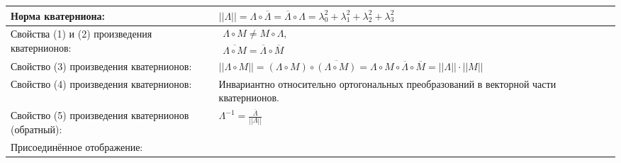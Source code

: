 \documentclass{article}
\begin{document}
\begin{tabular}{ |p{3.8cm}|p{5.7cm}|p{3.8cm}|p{5.7cm}|  }
Норма кватерниона:                                                           &  %
$||\Lambda|| = \Lambda \circ \overline{\Lambda} =
 \overline{\Lambda} \circ \Lambda =
 \lambda_{0}^2 + \lambda_{1}^2 + \lambda_{2}^2 + \lambda_{3}^2$              &  %
                                                                             &  %
                                                                             \\ %
\hline
Свойства (1) и (2) произведения кватернионов:                                &  %
$\begin{aligned}
\Lambda \circ M \neq M \circ \Lambda,      \\
\overline{\Lambda \circ M} = \overline{\Lambda} \circ \overline{M}
\end{aligned}$                                                               &  %
                                                                             &  %
                                                                             \\ %
\hline
Свойство (3) произведения кватернионов:                                      &  %
$||\Lambda \circ M|| =
 (\Lambda \circ M) \circ \overline{(\Lambda \circ M)} =
 \Lambda \circ M \circ \overline{\Lambda} \circ \overline{M} =
 ||\Lambda|| \cdot ||M||$                                                    &  %
                                                                             &  %
                                                                             \\ %
\hline
Свойство (4) произведения кватернионов:                                      &  %
Инвариантно относительно ортогональных преобразований в векторной
 части кватернионов.                                                         &  %
                                                                             &  %
                                                                             \\ %
\hline
Свойство (5) произведения кватернионов (обратный):                           &  %
$\Lambda^{-1} = \frac{\overline{\Lambda}}{||\Lambda||}$                      &  %
                                                                             &  %
                                                                             \\ %
\hline
Присоединённое отображение:                                                  &  %

\end{tabular}
\end{document}
